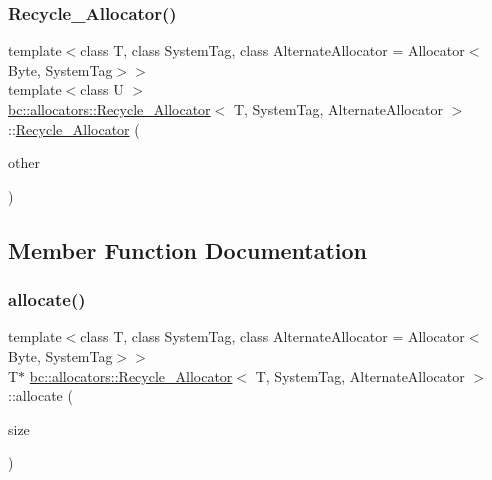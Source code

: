 \mbox{\label{structbc_1_1allocators_1_1Recycle__Allocator_a65fb793bf5bba8c22aaf79314e4c218b}} 
\subsubsection{\texorpdfstring{Recycle\+\_\+\+Allocator()}{Recycle\_Allocator()}\hspace{0.1cm}{\footnotesize\ttfamily [4/4]}}
{\footnotesize\ttfamily template$<$class T, class System\+Tag, class Alternate\+Allocator = Allocator$<$\+Byte, System\+Tag$>$$>$ \\
template$<$class U $>$ \\
\hyperlink{structbc_1_1allocators_1_1Recycle__Allocator}{bc\+::allocators\+::\+Recycle\+\_\+\+Allocator}$<$ T, System\+Tag, Alternate\+Allocator $>$\+::\hyperlink{structbc_1_1allocators_1_1Recycle__Allocator}{Recycle\+\_\+\+Allocator} (\begin{DoxyParamCaption}\item[{const \hyperlink{structbc_1_1allocators_1_1Recycle__Allocator}{Recycle\+\_\+\+Allocator}$<$ U, System\+Tag, Alternate\+Allocator $>$ \&}]{other }\end{DoxyParamCaption})\hspace{0.3cm}{\ttfamily [inline]}}



\subsection{Member Function Documentation}
\mbox{\label{structbc_1_1allocators_1_1Recycle__Allocator_a1b961439f6fa21100d1e23a7246982fe}} 
\subsubsection{\texorpdfstring{allocate()}{allocate()}}
{\footnotesize\ttfamily template$<$class T, class System\+Tag, class Alternate\+Allocator = Allocator$<$\+Byte, System\+Tag$>$$>$ \\
T$\ast$ \hyperlink{structbc_1_1allocators_1_1Recycle__Allocator}{bc\+::allocators\+::\+Recycle\+\_\+\+Allocator}$<$ T, System\+Tag, Alternate\+Allocator $>$\+::allocate (\begin{DoxyParamCaption}\item[{\hyperlink{namespacebc_aaf8e3fbf99b04b1b57c4f80c6f55d3c5}{bc\+::size\+\_\+t}}]{size }\end{DoxyParamCaption})\hspace{0.3cm}{\ttfamily [inline]}}

